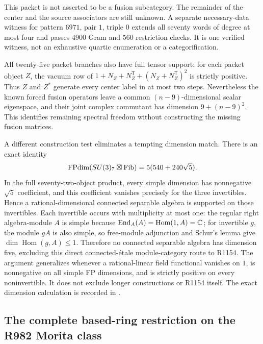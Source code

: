 This packet is not asserted to be a fusion subcategory. The remainder
of the center and the source associators are still unknown.
A separate necessary-data witness for pattern $6971$, pair $1$,
triple $0$ extends all seventy words of degree at most four and passes
$4900$ Gram and $560$ restriction checks. It is one verified witness,
not an exhaustive quartic enumeration or a categorification.

All twenty-five packet branches also have full tensor support: for each
packet object $Z$, the vacuum row of
$1+N_Z+N_Z^{\mathsf T}+(N_Z+N_Z^{\mathsf T})^2$ is strictly positive.
Thus $Z$ and $Z^*$ generate every center label in at most two steps.
Nevertheless the known forced fusion operators leave a common
$(n-9)$-dimensional scalar eigenspace, and their joint complex
commutant has dimension $9+(n-9)^2$. This identifies remaining spectral
freedom without constructing the missing fusion matrices.

A different construction test eliminates a tempting dimension match.
There is an exact identity
\[
 \operatorname{FPdim}(SU(3)_7\boxtimes\mathrm{Fib})=5(540+240\sqrt5).
\]
In the full seventy-two-object product, every simple dimension has
nonnegative $\sqrt5$ coefficient, and this coefficient vanishes
precisely for the three invertibles. Hence a rational-dimensional
connected separable algebra is supported on those invertibles.
Each invertible occurs with multiplicity at most one: the regular
right algebra-module $A$ is simple because
$\operatorname{End}_A(A)=\operatorname{Hom}(1,A)=\mathbb C$; for invertible
$g$, the module $gA$ is also simple, so free-module adjunction and
Schur's lemma give $\dim\operatorname{Hom}(g,A)\leq1$.
Therefore no connected separable algebra has dimension five, excluding
this direct connected-\'{e}tale module-category route to R1154.
The argument generalizes whenever a rational-linear field functional
vanishes on $1$, is nonnegative on all simple FP dimensions, and is
strictly positive on every noninvertible. It does not exclude longer
constructions or R1154 itself. The exact dimension calculation is
recorded in .

\subsection{The complete based-ring restriction on the R982 Morita class}
\label{subsec:creative-r982-morita}

